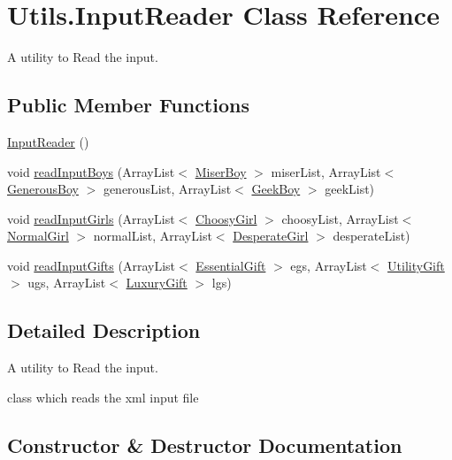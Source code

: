 \hypertarget{class_utils_1_1_input_reader}{}\section{Utils.\+Input\+Reader Class Reference}
\label{class_utils_1_1_input_reader}


A utility to Read the input.  


\subsection*{Public Member Functions}
\begin{DoxyCompactItemize}
\item 
\hyperlink{class_utils_1_1_input_reader_a77f9e89f94b59ed4847f68563b95c8bf}{Input\+Reader} ()
\item 
void \hyperlink{class_utils_1_1_input_reader_ab2be313d2fc617f2619432210b00d59d}{read\+Input\+Boys} (Array\+List$<$ \hyperlink{class_boys_1_1_miser_boy}{Miser\+Boy} $>$ miser\+List, Array\+List$<$ \hyperlink{class_boys_1_1_generous_boy}{Generous\+Boy} $>$ generous\+List, Array\+List$<$ \hyperlink{class_boys_1_1_geek_boy}{Geek\+Boy} $>$ geek\+List)
\item 
void \hyperlink{class_utils_1_1_input_reader_a2f95d37f265a7a62b792822e160a16c2}{read\+Input\+Girls} (Array\+List$<$ \hyperlink{class_girls_1_1_choosy_girl}{Choosy\+Girl} $>$ choosy\+List, Array\+List$<$ \hyperlink{class_girls_1_1_normal_girl}{Normal\+Girl} $>$ normal\+List, Array\+List$<$ \hyperlink{class_girls_1_1_desperate_girl}{Desperate\+Girl} $>$ desperate\+List)
\item 
void \hyperlink{class_utils_1_1_input_reader_ae5b928b1a6f7ddf7215a4b19b3c34daf}{read\+Input\+Gifts} (Array\+List$<$ \hyperlink{class_gifts_1_1_essential_gift}{Essential\+Gift} $>$ egs, Array\+List$<$ \hyperlink{class_gifts_1_1_utility_gift}{Utility\+Gift} $>$ ugs, Array\+List$<$ \hyperlink{class_gifts_1_1_luxury_gift}{Luxury\+Gift} $>$ lgs)
\end{DoxyCompactItemize}


\subsection{Detailed Description}
A utility to Read the input. 

class which reads the xml input file 

\subsection{Constructor \& Destructor Documentation}
\mbox{\label{class_utils_1_1_input_reader_a77f9e89f94b59ed4847f68563b95c8bf}} 
